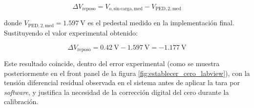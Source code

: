 \[
    \Delta V_{\mathrm{reposo}} = V_{o,\mathrm{sin\ carga,med}} - V_{\mathrm{PED,2,med}}
\]

donde $V_{\mathrm{PED,2,med}} = \SI{1.597}{\V}$ es el pedestal medido en la implementación final. Sustituyendo el valor experimental obtenido:

\[
    \Delta V_{\mathrm{reposo}} = \SI{0.42}{\V} - \SI{1.597}{\V} = \SI{-1.177}{\V}
\]

Este resultado coincide, dentro del error experimental (como se muestra posteriormente en el front panel de la figura \ref{fig:establecer_cero_labview}), con la tensión diferencial residual observada en el sistema antes de aplicar la tara por \textit{software}, y justifica la necesidad de la corrección digital del cero durante la calibración.